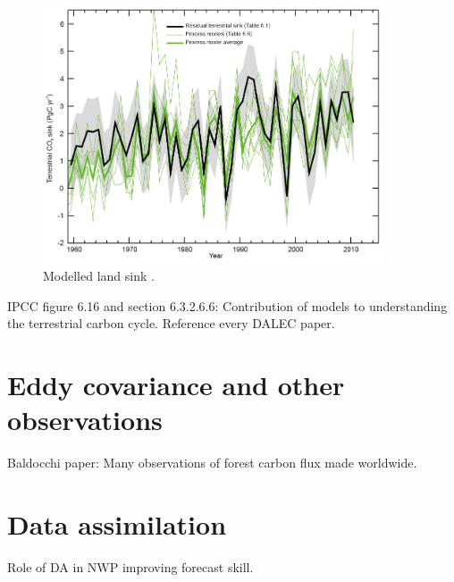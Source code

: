 \documentclass[11pt]{article}
\begin{document}
\begin{figure}[ht]
    \centering
    \includegraphics[width=0.9\textwidth]{ipcc_fig6_16.jpg}
    \caption{Modelled land sink \citep{ciais2014carbon}.}
    \label{fig:ipcc_fig6.16}
\end{figure}

IPCC figure 6.16 and section 6.3.2.6.6: Contribution of models to understanding the terrestrial carbon cycle. Reference every DALEC paper.

\section{Eddy covariance and other observations}

Baldocchi paper: Many observations of forest carbon flux made worldwide.

\section{Data assimilation}

Role of DA in NWP improving forecast skill. 


{}
\end{document}
